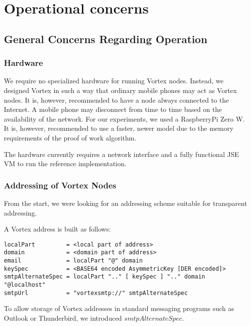\part{Operational concerns}\label{sec:operation}

\chapter{General Concerns Regarding Operation}
\section{Hardware}
We require no specialized hardware for running Vortex nodes. Instead, we designed Vortex in such a way that ordinary mobile phones may act as Vortex nodes. It is, however, recommended to have a node always connected to the Internet. A mobile phone may disconnect from time to time based on the availability of the network. For our experiments, we used a RaspberryPi Zero W. It is, however, recommended to use a faster, newer model due to the memory requirements of the proof of work algorithm. 

The hardware currently requires a network interface and a fully functional JSE VM to run the reference implementation.

\section{Addressing of Vortex Nodes}
From the start, we were looking for an addressing scheme suitable for transparent addressing.

A Vortex address is built as follows: 

\begin{lstlisting}[language=EBNF]
localPart         = <local part of address>
domain            = <domain part of address>
email             = localPart "@" domain
keySpec           = <BASE64 encoded AsymmetricKey [DER encoded]>
smtpAlternateSpec = localPart ".." [ keySpec ] ".." domain "@localhost"
smtpUrl           = "vortexsmtp://" smtpAlternateSpec
\end{lstlisting}

To allow storage of Vortex addresses in standard messaging programs such as Outlook or Thunderbird, we introduced $smtpAlternateSpec$. 

